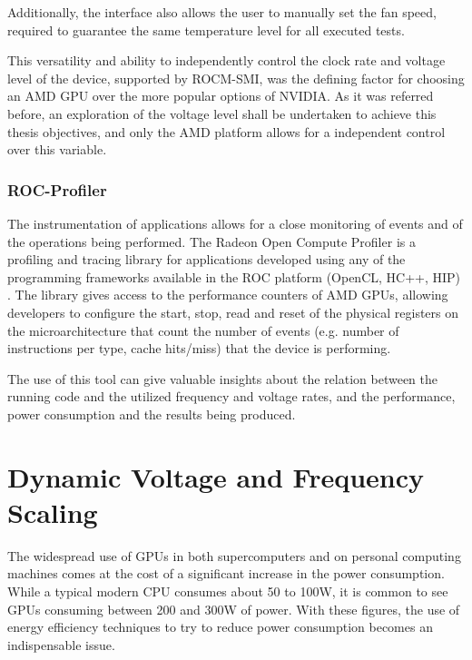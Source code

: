 Additionally, the interface also allows the user to manually set the fan speed, required to guarantee the same temperature level for all executed tests.

This versatility and ability to independently control the clock rate and voltage level of the device, supported by ROCM-SMI, was the defining factor for choosing an AMD GPU over the more popular options of NVIDIA. As it was referred before, an exploration of the voltage level shall be undertaken to achieve this thesis objectives, and only the AMD platform allows for a  independent control over this variable.

\subsubsection{ROC-Profiler}

The instrumentation of applications allows for a close monitoring of events and of the operations being performed. The Radeon Open Compute Profiler \cite{noauthor_rocm-developer-tools/rocprofiler_2019} is a profiling and tracing library for applications developed using any of the programming frameworks available in the ROC platform (OpenCL, HC++, HIP) \cite{sun_evaluating_2018}. The library gives access to the performance counters of AMD GPUs, allowing developers to configure the start, stop, read and reset of the physical registers on the microarchitecture that count the number of events (e.g. number of instructions per type, cache hits/miss) that the device is performing.

The use of this tool can give valuable insights about the relation between the running code and the utilized frequency and voltage rates, and the performance, power consumption and the results being produced.




\section{Dynamic Voltage and Frequency Scaling}
\label{section:dcvf}

The widespread use of GPUs in both supercomputers and on personal computing machines comes at the cost of a significant increase in the power consumption. While a typical modern CPU consumes about 50 to 100W, it is common to see GPUs consuming between 200 and 300W of power. With these figures, the use of energy efficiency techniques to try to reduce power consumption becomes an indispensable issue.

